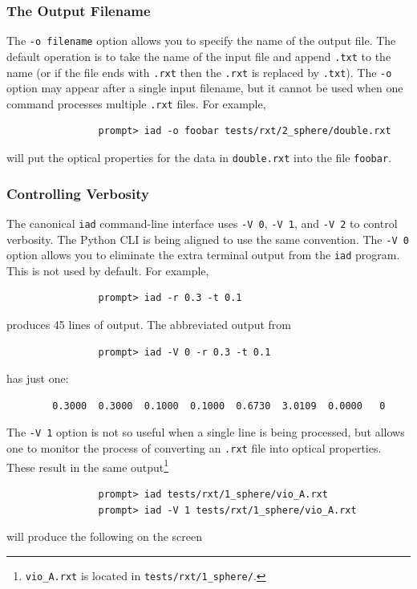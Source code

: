 \documentclass{article}
\newcommand\iadprog{\texttt{iad}}
\begin{document}
\subsubsection{The Output Filename}

The \texttt{-o filename} option allows you to specify the name of the output
file.  The default operation is to take the name of the input file and append
\texttt{.txt} to the name (or if the file ends with \texttt{.rxt} then
the \texttt{.rxt} is replaced by \texttt{.txt}).  The \texttt{-o} option may
appear after a single input filename, but it cannot be used when one command
processes multiple \texttt{.rxt} files.  For example,
\begin{verbatim}
                prompt> iad -o foobar tests/rxt/2_sphere/double.rxt
\end{verbatim}
will put the optical properties for the data in \texttt{double.rxt}
 into the file \texttt{foobar}.

\subsubsection{Controlling Verbosity}

The canonical \texttt{iad} command-line interface uses \texttt{-V 0},
\texttt{-V 1}, and \texttt{-V 2} to control verbosity.  The Python CLI is
being aligned to use the same convention.  The \texttt{-V 0} option allows you
to eliminate the extra terminal output from the \iadprog{} program.  This is not
used by default. For example,
\begin{verbatim}
                prompt> iad -r 0.3 -t 0.1
\end{verbatim}
produces 45 lines of output.  The abbreviated output from
\begin{verbatim}
                prompt> iad -V 0 -r 0.3 -t 0.1
\end{verbatim}
has just one:
\begin{verbatim}
        0.3000  0.3000  0.1000  0.1000  0.6730  3.0109  0.0000   0
\end{verbatim}

The \texttt{-V 1} option is not so useful when a single line
is being processed, but allows one to monitor the process of converting
an \texttt{.rxt} file into optical properties.  These result in the same
output\footnote{\texttt{vio\_A.rxt} is located in \texttt{tests/rxt/1\_sphere/}.}
\begin{verbatim}
                prompt> iad tests/rxt/1_sphere/vio_A.rxt
                prompt> iad -V 1 tests/rxt/1_sphere/vio_A.rxt
\end{verbatim}
will produce the following on the screen
\end{document}
